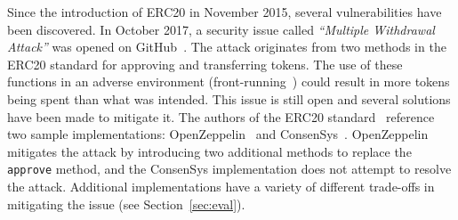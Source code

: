 

Since the introduction of ERC20 in November 2015, several vulnerabilities have been discovered. In October 2017, a security issue called \textit{``Multiple Withdrawal Attack''} was opened on GitHub~\cite{Ref13,Ref07}. The attack originates from two methods in the ERC20 standard for approving and transferring tokens. The use of these functions in an adverse environment (\eg front-running~\cite{eskandari2019sok}) could result in more tokens being spent than what was intended. This issue is still open and several solutions have been made to mitigate it. The authors of the ERC20 standard~\cite{Ref08} reference two sample implementations: OpenZeppelin~\cite{Ref10} and ConsenSys~\cite{Ref11}. OpenZeppelin mitigates the attack by introducing two additional methods to replace the \texttt{approve} method, and the ConsenSys implementation does not attempt to resolve the attack. Additional implementations have a variety of different trade-offs in mitigating the issue (see Section~\ref{sec:eval}).

